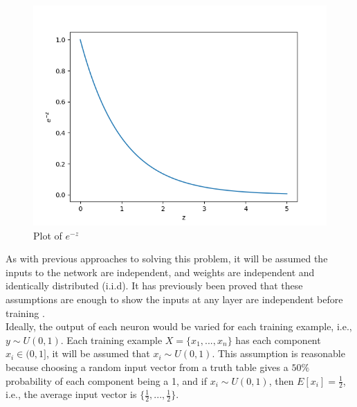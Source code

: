 \begin{minipage}[t]{0.4\textwidth}
\vspace{0px}
\begin{figure}[H]
\vspace{0px}
    \includegraphics[width=\textwidth]{activation-plot.png}
    \caption{Plot of $e^{-z}$}
    \label{fig:activation-plot}
\end{figure}
\end{minipage}

As with previous approaches to solving this problem, it will be assumed the inputs to the network are independent, and weights are independent and identically distributed (i.i.d). It has previously been proved that these assumptions are enough to show the inputs at any layer are independent before training \cite{kumar2017weight}.\\

Ideally, the output of each neuron would be varied for each training example, i.e., $y \sim U(0,1)$. Each training example $X = \{x_1, ..., x_n\}$ has each component $x_i \in (0,1]$, it will be assumed that $x_i \sim U(0,1)$. This assumption is reasonable because choosing a random input vector from a truth table gives a $50\%$ probability of each component being a 1, and if $x_i \sim U(0,1)$, then $E[x_i] = \frac{1}{2}$, i.e., the average input vector is $\{\frac{1}{2}, ..., \frac{1}{2}\}$.

